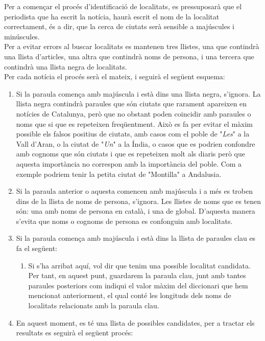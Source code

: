 \documentclass[12pt,a4paper,openright,oneside]{article}
\numberwithin{equation}{section}
\theoremstyle{definition}
\begin{document}
Per a començar el procés d'identificació de localitats, es pressuposarà que el periodista que ha escrit la notícia, haurà escrit el nom de la localitat correctament, és a dir, que la cerca de ciutats serà sensible a majúscules i minúscules.\\
Per a evitar errors al buscar localitats es mantenen tres llistes, una que contindrà una llista d'articles, una altra que contindrà noms de persona, i una tercera que contindrà una llista negra de localitats.\\
Per cada notícia el procés serà el mateix, i seguirà el següent esquema:
\begin{enumerate}
\item Si la paraula comença amb majúscula i està dins una llista negra, s'ignora. La llista negra contindrà paraules que són ciutats que rarament apareixen en notícies de Catalunya, però que no obstant poden coincidir amb paraules o noms que si que es repeteixen freqüentment. Això es fa per evitar el màxim possible els falsos positius de ciutats, amb casos com el poble de "\emph{Les}" a la Vall d'Aran, o la ciutat de "\emph{Un}" a la Índia, o casos que es podrien confondre amb cognoms que són ciutats i que es repeteixen molt als diaris però que aquesta importància no correspon amb la importància del poble. Com a exemple podriem tenir la petita ciutat de "Montilla" a Andalusia.
\item Si la paraula anterior o aquesta comencen amb majúscula i a més es troben dins de la llista de noms de persona, s'ignora. Les llistes de noms que es tenen són: una amb noms de persona en català\cite{softcatala}, i una de global\cite{nomsmon}. D'aquesta manera s'evita que noms o cognoms de persona es confonguin amb localitats.
\item Si la paraula comença amb majúscula i està dins la llista de paraules clau es fa el següent:
\begin{enumerate}
\item Si s'ha arribat aquí, vol dir que tenim una possible localitat candidata. Per tant, en aquest punt, guardarem la paraula clau, junt amb tantes paraules posteriors com indiqui el valor màxim del diccionari que hem mencionat anteriorment, el qual conté les longituds dels noms de localitats relacionats amb la paraula clau.
\end{enumerate}
\item En aquest moment, es té una llista de possibles candidates, per a tractar els resultats es seguirà el següent procés:
\begin{enumerate}

\end{enumerate}
\end{enumerate}
\end{document}
